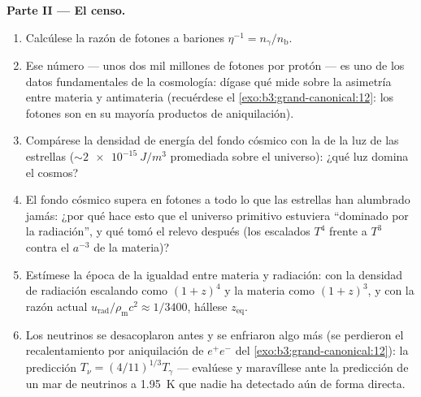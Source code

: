 \begin{problem}
\medskip\noindent\textbf{Parte II --- El censo.}
\begin{enumerate}[resume]
  \item Calcúlese la razón de fotones a bariones $\eta^{-1} =
        n_\gamma/n_{\text{b}}$.
  \item Ese número --- unos dos mil millones de fotones por protón ---
        es uno de los datos fundamentales de la cosmología: dígase qué
        mide sobre la asimetría entre materia y antimateria (recuérdese el
        \cref{exo:b3:grand-canonical:12}: los fotones son en su mayoría
        productos de aniquilación).
  \item Compárese la densidad de energía del fondo cósmico con la de la luz
        de las estrellas ($\sim\qty{2e-15}{J/m^3}$ promediada sobre el universo):
        ¿qué luz domina el cosmos?
  \item El fondo cósmico supera en fotones a todo lo que las estrellas han
        alumbrado jamás: ¿por qué hace esto que el universo primitivo
        estuviera ``dominado por la radiación'', y qué tomó el relevo después (los
        escalados $T^4$ frente a $T^3$ contra el $a^{-3}$ de la materia)?
  \item Estímese la época de la igualdad entre materia y radiación: con la
        densidad de radiación escalando como $(1+z)^4$ y la materia como
        $(1+z)^3$, y con la razón actual
        $u_{\text{rad}}/\rho_{\text{m}}c^2 \approx 1/3400$, hállese
        $z_{\text{eq}}$.
  \item Los neutrinos se desacoplaron antes y se enfriaron algo más
        (se perdieron el recalentamiento por aniquilación de $e^+e^-$ del
        \cref{exo:b3:grand-canonical:12}): la predicción
        $T_\nu = (4/11)^{1/3}T_\gamma$ --- evalúese y
        maravíllese ante la predicción de un mar de neutrinos a \qty{1.95}{K}
        que nadie ha detectado aún de forma directa.
\end{enumerate}


\end{problem}
